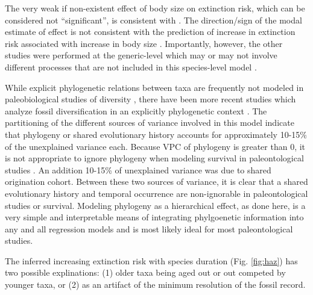 \documentclass[12pt,letterpaper]{article}
\begin{document}
The very weak if non-existent effect of body size on extinction risk, which can be considered not ``significant'', is consistent with \citet{Tomiya2013}. The direction/sign of the modal estimate of effect is not consistent with the prediction of increase in extinction risk associated with increase in body size \citep{Liow2008}. Importantly, however, the other studies were performed at the generic-level which may or may not involve different processes that are not included in this species-level model \citep{Liow2008,Tomiya2013}.

While explicit phylogenetic relations between taxa are frequently not modeled in paleobiological studies of diversity \citep{Alroy2009,Foote2013,Jablonski2006a,Hunt2007a,Liow2008,Payne2007,Alroy2000g,Jernvall2002,Jernvall2004,Marcot2014}, there have been more recent studies which analyze fossil diversification in an explicitly phylogenetic context \citep{Slater2012,Slater2013a,Tomiya2013,Harnik2014,Simpson2011a}. The partitioning of the different sources of variance involved in this model indicate that phylogeny or shared evolutionary history accounts for approximately 10-15\% of the unexplained variance each. Because VPC of phylogeny is greater than 0, it is not appropriate to ignore phylogeny when modeling survival in paleontological studies \citep{Housworth2004}. An addition 10-15\% of unexplained variance was due to shared origination cohort. Between these two sources of variance, it is clear that a shared evolutionary history and temporal occurrence are non-ignorable in paleontological studies or survival. Modeling phylogeny as a hierarchical effect, as done here, is a very simple and interpretable means of integrating phylgoenetic information into any and all regression models \citep{Lynch1991,Housworth2004} and is most likely ideal for most paleontological studies.

The inferred increasing extinction risk with species duration (Fig. \ref{fig:haz}) has two possible explinations: (1) older taxa being aged out or out competed by younger taxa, or (2) as an artifact of the minimum resolution of the fossil record.
\end{document}

